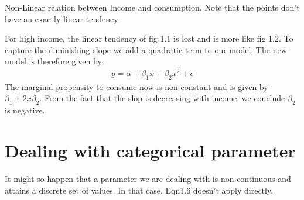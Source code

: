 \documentclass[notoc]{tufte-book}
\begin{document}
\begin{marginfigure}
\caption{Non-Linear relation between Income and consumption. Note that the points don't have an exactly linear tendency}
\end{marginfigure}
\begin{tcolorbox}[colback=c4,colframe=c3,title=Example 1.2: Non-Linear modelling consumption with respect to income]
For high income, the linear tendency of fig 1.1 is lost and is more like fig 1.2. To capture the diminishing slope we add a quadratic term to our model. The new model is therefore given by:
\begin{align}
    y=\alpha+\beta_1x+\beta_2x^2+\epsilon
\end{align}
The marginal propensity to consume now is non-constant and is given by $\beta_1+2x\beta_2$. From the fact that the slop is decreasing with income, we conclude $\beta_2$ is negative.
\end{tcolorbox}



















\section{Dealing with categorical parameter}
It might so happen that a parameter we are dealing with is non-continuous and attains a discrete set of values. In that case, Eqn1.6 doesn't apply directly.
\end{document}

